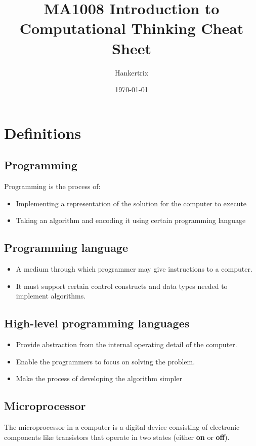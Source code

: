 \documentclass[11pt]{article}
\author{Hankertrix}
\date{\today}
\title{MA1008 Introduction to Computational Thinking Cheat Sheet}
\begin{document}
\maketitle
\setcounter{tocdepth}{2}
\tableofcontents \clearpage
\section{Definitions}
\label{sec:orge2401aa}

\subsection{Programming}
\label{sec:orgffb1201}
Programming is the process of:
\begin{itemize}
\item Implementing a representation of the solution for the computer to execute
\item Taking an algorithm and encoding it using certain programming language
\end{itemize}

\subsection{Programming language}
\label{sec:orgf601263}
\begin{itemize}
\item A medium through which programmer may give instructions to a computer.
\item It must support certain control constructs and data types needed to implement algorithms.
\end{itemize}

\subsection{High-level programming languages}
\label{sec:org223ac54}
\begin{itemize}
\item Provide abstraction from the internal operating detail of the computer.
\item Enable the programmers to focus on solving the problem.
\item Make the process of developing the algorithm simpler
\end{itemize}

\subsection{Microprocessor}
\label{sec:orgfc5d627}
The microprocessor in a computer is a digital device consisting of electronic components like transistors that operate in two states (either \textbf{on} or \textbf{off}).
\end{document}
